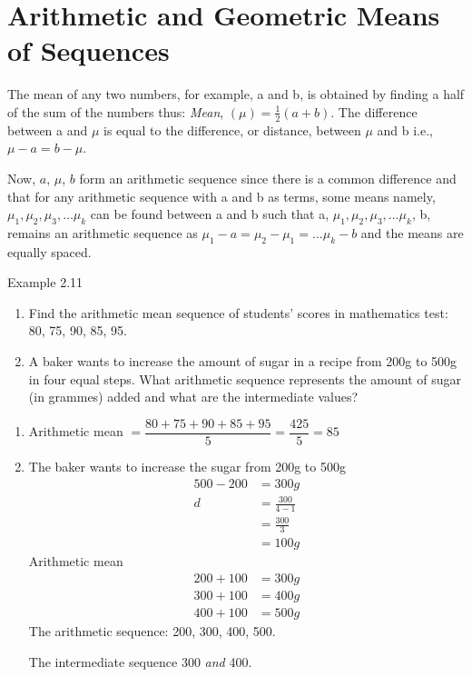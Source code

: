 \section{Arithmetic and Geometric Means of Sequences}

The mean of any two numbers, for example, a and b, is obtained by finding a half
of the sum of the numbers thus: \textit{Mean}, $(\mu) = \frac{1}{2}(a + b)$. The difference
between a and $\mu$ is equal to the difference, or distance, between $\mu$ and b i.e.,
$\mu - a = b - \mu$.

Now, $a$, $\mu$, $b$ form an arithmetic sequence since there is a common difference and
that for any arithmetic sequence with a and b as terms, some means namely,
$\mu_1, \mu_2, \mu_3, \ldots \mu_k$ can be found between a and b such that a,
$\mu_1, \mu_2, \mu_3, \ldots \mu_k$, b, remains an arithmetic sequence as
$\mu_1 - a = \mu_2 - \mu_1 = \ldots \mu_k - b$ and the means are equally spaced.

\begin{example}{Example 2.11}
\begin{enumerate}
  \item Find the arithmetic mean sequence of students' scores in mathematics test:
  80, 75, 90, 85, 95.
  \item A baker wants to increase the amount of sugar in a recipe from 200g to
  500g in four equal steps. What arithmetic sequence represents the amount
  of sugar (in grammes) added and what are the intermediate values?
\end{enumerate}

\solution
\begin{enumerate}
  \item Arithmetic mean $= \dfrac{80 + 75 + 90 + 85 + 95}{5} = \dfrac{425}{5} = 85$
  \item The baker wants to increase the sugar from 200g to 500g
  \begin{align*}
    500 - 200 &= 300g \\
    d &= \frac{300}{4 - 1} \\
    &= \frac{300}{3} \\
    &= 100g
  \end{align*}
  Arithmetic mean
  \begin{align*}
    200 + 100 &= 300g \\
    300 + 100 &= 400g \\
    400 + 100 &= 500g
  \end{align*}
  The arithmetic sequence: 200, 300, 400, 500.

  The intermediate sequence 300 \textit{and} 400.
\end{enumerate}
\end{example}

